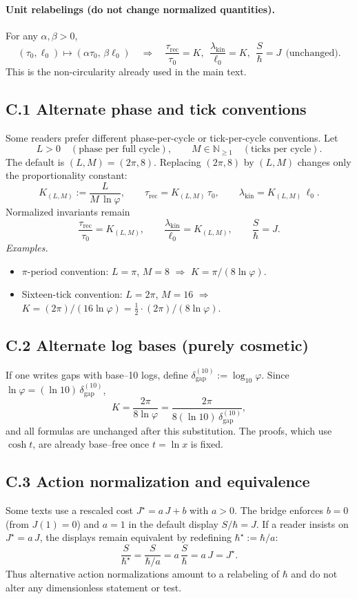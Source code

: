 \documentclass[11pt]{article}
\theoremstyle{plain}
\theoremstyle{definition}
\theoremstyle{remark}
\begin{document}
\paragraph{Unit relabelings (do not change normalized quantities).}
For any \(\alpha,\beta>0\),
\[
(\tau_{0},\ell_{0})\mapsto(\alpha\tau_{0},\,\beta\ell_{0})\quad\Rightarrow\quad
\frac{\tau_{\mathrm{rec}}}{\tau_{0}}=K,\ \ \frac{\lambda_{\mathrm{kin}}}{\ell_{0}}=K,\ \ \frac{S}{\hbar}=J
\ \ \text{(unchanged)}.
\]
This is the non-circularity already used in the main text.

\subsection*{C.1 Alternate phase and tick conventions}
Some readers prefer different phase-per-cycle or tick-per-cycle conventions. Let
\[
L>0\quad(\text{phase per full cycle}),\qquad M\in\mathbb{N}_{\ge 1}\quad(\text{ticks per cycle}).
\]
The default is \((L,M)=(2\pi,8)\). Replacing \((2\pi,8)\) by \((L,M)\) changes only the proportionality constant:
\[
K_{(L,M)}:=\frac{L}{M\,\ln\varphi},\qquad
\tau_{\mathrm{rec}}=K_{(L,M)}\,\tau_{0},\qquad
\lambda_{\mathrm{kin}}=K_{(L,M)}\,\ell_{0}.
\]
Normalized invariants remain
\[
\frac{\tau_{\mathrm{rec}}}{\tau_{0}}=K_{(L,M)},\qquad
\frac{\lambda_{\mathrm{kin}}}{\ell_{0}}=K_{(L,M)},\qquad
\frac{S}{\hbar}=J.
\]
\emph{Examples.}
\begin{itemize}
  \item \(\pi\)-period convention: \(L=\pi\), \(M=8\) \(\Rightarrow\) \(K=\pi/(8\ln\varphi)\).
  \item Sixteen-tick convention: \(L=2\pi\), \(M=16\) \(\Rightarrow\) \(K=(2\pi)/(16\ln\varphi)=\tfrac12\cdot (2\pi)/(8\ln\varphi)\).
\end{itemize}

\subsection*{C.2 Alternate log bases (purely cosmetic)}
If one writes gaps with base–10 logs, define \(\delta_{\mathrm{gap}}^{(10)}:=\log_{10}\varphi\). Since \(\ln\varphi=(\ln 10)\,\delta_{\mathrm{gap}}^{(10)}\),
\[
K=\frac{2\pi}{8\ln\varphi}
=\frac{2\pi}{8(\ln 10)\,\delta_{\mathrm{gap}}^{(10)}},
\]
and all formulas are unchanged after this substitution. The proofs, which use \(\cosh t\), are already base–free once \(t=\ln x\) is fixed.

\subsection*{C.3 Action normalization and equivalence}
Some texts use a rescaled cost \(J^{\star}=a\,J+b\) with \(a>0\). The bridge enforces \(b=0\) (from \(J(1)=0\)) and \(a=1\) in the default display \(S/\hbar=J\). If a reader insists on \(J^{\star}=a\,J\), the displays remain equivalent by redefining \(\hbar^{\star}:=\hbar/a\):
\[
\frac{S}{\hbar^{\star}}=\frac{S}{\hbar/a}=a\,\frac{S}{\hbar}=a\,J=J^{\star}.
\]
Thus alternative action normalizations amount to a relabeling of \(\hbar\) and do not alter any dimensionless statement or test.
\end{document}
